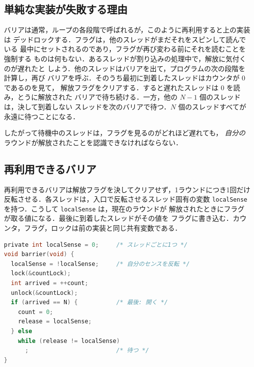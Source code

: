 \documentclass[../main.tex]{subfiles}
\begin{document}
\subsection{単純な実装が失敗する理由}

バリアは通常，ループの各段階で呼ばれるが，このように再利用すると上の実装は
デッドロックする．フラグは，他のスレッドがまだそれをスピンして読んでいる
最中にセットされるのであり，フラグが再び変わる前にそれを読むことを強制する
ものは何もない．あるスレッドが割り込みの処理中で，解放に気付くのが遅れたと
しよう．他のスレッドはバリアを出て，プログラムの次の段階を計算し，再び
バリアを呼ぶ．そのうち最初に到着したスレッドはカウンタが 0 であるのを見て，
解放フラグをクリアする．すると遅れたスレッドは 0 を読み，とうに解放された
バリアで待ち続ける．一方，他の $N-1$ 個のスレッドは，決して到着しない
スレッドを次のバリアで待つ．$N$ 個のスレッドすべてが永遠に待つことになる．

したがって待機中のスレッドは，フラグを見るのがどれほど遅れても，
\emph{自分の}ラウンドが解放されたことを認識できなければならない．

\subsection{再利用できるバリア}

再利用できるバリアは解放フラグを決してクリアせず，1ラウンドにつき1回だけ
反転させる．各スレッドは，入口で反転させるスレッド固有の変数
\texttt{localSense} を持つ．こうして \texttt{localSense} は，現在のラウンドが
解放されたときにフラグが取る値になる．最後に到着したスレッドがその値を
フラグに書き込む．カウンタ，フラグ，ロックは前の実装と同じ共有変数である．
\begin{lstlisting}[language=C, numbers=none, morekeywords={shared,private}]
private int localSense = 0;     /* スレッドごとに1つ */
void barrier(void) {
  localSense = !localSense;     /* 自分のセンスを反転 */
  lock(&countLock);
  int arrived = ++count;
  unlock(&countLock);
  if (arrived == N) {           /* 最後: 開く */
    count = 0;
    release = localSense;
  } else
    while (release != localSense)
      ;                         /* 待つ */
}
\end{lstlisting}
\end{document}
